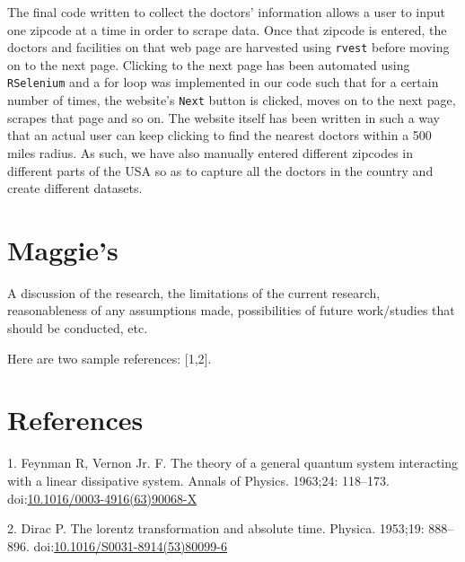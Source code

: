 \documentclass[10pt,letterpaper]{article}
\begin{document}
The final code written to collect the doctors' information allows a user
to input one zipcode at a time in order to scrape data. Once that
zipcode is entered, the doctors and facilities on that web page are
harvested using \texttt{rvest} before moving on to the next page.
Clicking to the next page has been automated using \texttt{RSelenium}
and a for loop was implemented in our code such that for a certain
number of times, the website's \texttt{Next} button is clicked, moves on
to the next page, scrapes that page and so on. The website itself has
been written in such a way that an actual user can keep clicking to find
the nearest doctors within a 500 miles radius. As such, we have also
manually entered different zipcodes in different parts of the USA so as
to capture all the doctors in the country and create different datasets.

\section{Maggie's}\label{maggies-1}

A discussion of the research, the limitations of the current research,
reasonableness of any assumptions made, possibilities of future
work/studies that should be conducted, etc.

Here are two sample references: {[}1,2{]}.

\section*{References}\label{references}

\hypertarget{refs}{}
\hypertarget{ref-Feynman1963118}{}
1. Feynman R, Vernon Jr. F. The theory of a general quantum system
interacting with a linear dissipative system. Annals of Physics.
1963;24: 118--173.
doi:\href{https://doi.org/10.1016/0003-4916(63)90068-X}{10.1016/0003-4916(63)90068-X}

\hypertarget{ref-Dirac1953888}{}
2. Dirac P. The lorentz transformation and absolute time. Physica.
1953;19: 888--896.
doi:\href{https://doi.org/10.1016/S0031-8914(53)80099-6}{10.1016/S0031-8914(53)80099-6}

\nolinenumbers
\end{document}
